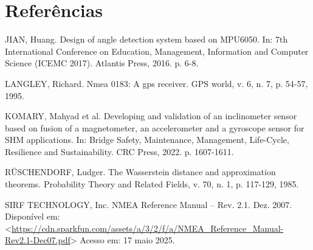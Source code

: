 \newpage

\pagestyle{modeloReferencias}


\section*{Referências}
\vspace{-.5cm}

\vspace{.5cm}\noindent
JIAN, Huang. Design of angle detection system based on MPU6050. In: 7th International Conference on Education, Management, Information and Computer Science (ICEMC 2017). Atlantis Press, 2016. p. 6-8.

\vspace{.5cm}\noindent
LANGLEY, Richard. Nmea 0183: A gps receiver. GPS world, v. 6, n. 7, p. 54-57, 1995.

\vspace{.5cm}\noindent
KOMARY, Mahyad et al. Developing and validation of an inclinometer sensor based on fusion of a magnetometer, an accelerometer and a gyroscope sensor for SHM applications. In: Bridge Safety, Maintenance, Management, Life-Cycle, Resilience and Sustainability. CRC Press, 2022. p. 1607-1611.

\vspace{.5cm}\noindent
RÜSCHENDORF, Ludger. The Wasserstein distance and approximation theorems. Probability Theory and Related Fields, v. 70, n. 1, p. 117-129, 1985.

\vspace{.5cm}\noindent
SIRF TECHNOLOGY, Inc. NMEA Reference Manual – Rev. 2.1. Dez. 2007. Disponível em:
<\url{https://cdn.sparkfun.com/assets/a/3/2/f/a/NMEA_Reference_Manual-Rev2.1-Dec07.pdf}> Acesso
em: 17 maio 2025.

\phantom{a}